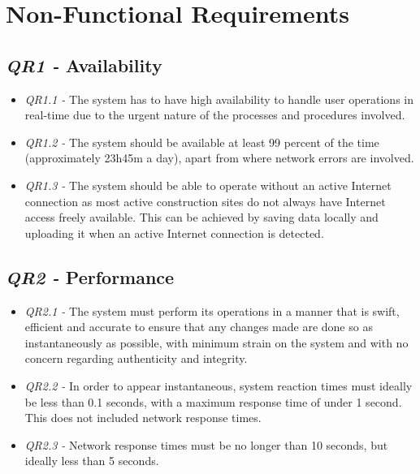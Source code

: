 \documentclass[11pt]{article}
\begin{document}
 \newpage

\section{Non-Functional Requirements}
\subsection{\textit{QR1 -} Availability} \label{availability}
\begin{itemize}
    \item \textit{QR1.1 -} The system has to have high availability to handle user operations in real-time due to the urgent nature of the processes and procedures involved.
    \item \textit{QR1.2 -} The system should be available at least 99 percent of the time (approximately 23h45m a day), apart from where network errors are involved.
    \item \textit{QR1.3 -} The system should be able to operate without an active Internet connection as most active construction sites do not always have Internet access freely available. This can be achieved by saving data locally and uploading it when an active Internet connection is detected.
\end{itemize}

\subsection{\textit{QR2 -} Performance}
\begin{itemize}
    \item \textit{QR2.1 -} The system must perform its operations in a manner that is swift, efficient and accurate to ensure that any changes made are done so as instantaneously as possible, with minimum strain on the system and with no concern regarding authenticity and integrity.
    \item \textit{QR2.2 -} In order to appear instantaneous, system reaction times must ideally be less than 0.1 seconds, with a maximum response time of under 1 second. This does not included network response times.
    \item \textit{QR2.3 -} Network response times must be no longer than 10 seconds, but ideally less than 5 seconds.
\end{itemize}
\end{document}
